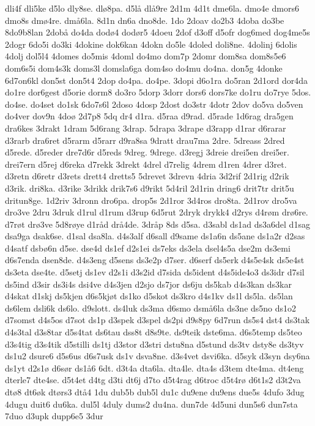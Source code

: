 {dli4f
dli5ke
d5lo
dly8se.
dlø8pa.
d5lå
dlå9re
2d1m
4d1t
dme6la.
dmo4e
dmors6
dmo8s
dmø4re.
dmå6la.
8d1n
dn6a
dno8de.
1do
2doav
do2b3
4doba
do3be
8do9b8lan
2dobå
do4da
dodø4
dodør5
4doeu
2dof
d3off
d5ofr
dog6med
dog4me5s
2dogr
6do5i
do3ki
4dokine
dok6kan
4dokn
do5le
4doled
doli8ne.
4dolinj
6dolis
4dolj
dol5l4
4domes
do5mis
4doml
do4mo
dom7p
2domr
dom8sa
dom8s5e6
dom6s5i
dom4s3k
doms3l
domsla6ga
dom4so
do4mu
do4na.
don5g
4donke
6d7on6kl
don5st
don5t4
2dop
do4pa.
do4pe.
3dopi
d6o1ra
do5ran
2d1ord
dor4da
do1re
dor6gest
d5orie
dorm8
do3ro
5dorp
3dorr
dors6
dors7ke
do1ru
do7rye
5dos.
do4se.
do4set
do1sk
6do7s6l
2doso
4dosp
2dost
do3str
4dotr
2dov
do5va
do5ven
do4ver
dov9n
4doø
2d7p8
5dq
dr4
d1ra.
d5raa
d9rad.
d5rade
1d6rag
dra5gen
dra6kes
3drakt
1dram
5d6rang
3drap.
5drapa
3drape
d3rapp
d1rar
d6rarar
d3rarb
dra6ret
d5rarm
d5rarr
d9ra8sa
9dratt
drau7ma
2dre.
5dreass
2dred
d5rede.
d5reder
dre7d6r
d5reds
9dreg.
9drege.
d3regj
3dreie
drei5en
drei5er.
drei7ern
d5rej
d6reka
d7rekk
3drekt
4drel
d7relig
4drem
d1ren
4drer
d3ret.
d3retn
d6retr
d3rets
drett4
dretts5
5drevet
3drevn
4dria
3d2rif
2d1rig
d2rik
d3rik.
dri8ka.
d3rike
3drikk
drik7s6
d9rikt
5d4ril
2d1rin
dring6
drit7tr
drit5u
dritun8ge.
1d2riv
3dronn
dro6pa.
drop5s
2d1ror
3d4ros
dro8ta.
2d1rov
dro5va
dro3ve
2dru
3druk
d1rul
d1rum
d3rup
6d5rut
2dryk
drykk4
d2rys
d4røm
drø6re.
d7røt
drø3ve
5d8røye
d1råd
drå4de.
3dråp
8ds
d5sa.
d3sabl
ds1ad
ds3a6del
d1sag
dsa9ga
dsak6se.
d1sal
dsa8la.
d4s3alf
d6sall
d9same
ds1a6n
ds5ane
ds1a2r
d2sas
d4satf
dsbø6n
d5se.
dse4d
ds1ef
d2s1ei
ds7eks
ds3ela
dsel4s5a
dse2m
ds3emi
d6s7enda
dsen8de.
d4s3eng
d5sens
ds3e2p
d7ser.
d6serf
ds5erk
d4s5e4sk
ds5e4st
ds3eta
dse4te.
d5setj
ds1ev
d2s1i
d3s2id
d7sida
ds5ident
d4s5ide4o3
ds3idr
d7sil
ds5ind
d3sir
ds3i4s
dsi4ve
d4s3jen
d2sjo
ds7jor
ds6ju
ds5kab
d4s3kan
ds3kar
d4skat
d1skj
ds5kjen
d6s5kjøt
ds1ko
d5skot
ds3kro
d4s1kv
ds1l
ds5la.
ds5lan
ds6lem
dsli6k
ds6lo.
d9slott.
ds4luk
ds3ma
d6smo
dsmå6la
ds3ne
ds5no
ds1o2
d7somst
d4s5os
d7sot
ds1p
d3spek
d3spel
ds2pi
d9s8py
6d7run
ds5s4
dst4
ds3tak
d4s3tal
d3s8tar
d5s4tat
ds6tau
dss8t
d8s9te.
ds9teik
dste6ma.
d6s5temp
ds5teo
d3s4tig
d3s4tik
d5stilli
ds1tj
d3stor
d3stri
dstu8na
d5stund
ds3tv
dsty8e
ds3tyv
ds1u2
dsure6
d5s6us
d6s7usk
ds1v
dsva8ne.
d3s4vet
dsvi6ka.
d5syk
d3syn
dsy6na
ds1yt
d2s1ø
d6sør
ds1å6
6dt.
d3t4a
dta6la.
dta4le.
dta4s
d3tem
dte4ma.
dt4eng
dterle7
dte4se.
d5t4et
d4tg
d3ti
dt6j
d7to
d5t4rag
d6troc
d5t4rø
d6t1s2
d3t2va
dtø8
dt6øk
dtørs3
dtå4
1du
dub5b
dub5l
du1c
du9ene
du9ens
due5s
4dufo
3dug
4dugu
duit6
du6ka.
dul5l
4duly
dums2
du4na.
dun7de
4d5uni
dun5s6
dun7sta
7duo
d3upk
dupp6e5
3dur
}
